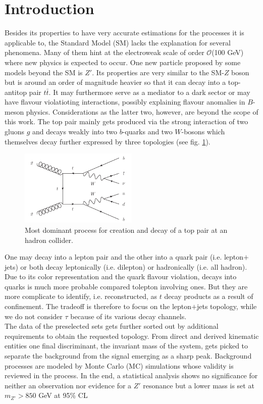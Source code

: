
\section{Introduction}
Besides its properties to have very accurate estimations for the processes it is applicable to, the Standard Model (SM) lacks the explanation for 
several phenomena. Many of them hint at the electroweak scale of order $\mathcal{O}$(100 GeV) where new physics is expected to occur. One new particle
proposed by some models beyond the SM is $Z'$. Its properties are very similar to the SM-$Z$ boson but is around an order of magnitude heavier so that
it can decay into a top-antitop pair $t\bar t$. It may furthermore serve as a mediator to a dark sector or may have flavour violatioting interactions, 
possibly 
explaining flavour anomalies in $B$-meson physics. Considerations as the latter two, however, are beyond the scope of this work. The top pair mainly
gets produced via the strong interaction of two gluons $g$ and decays weakly into two $b$-quarks and two $W$-bosons which themselves decay further 
expressed by three topologies (see fig. \ref{pic:feynman}). 
\begin{figure}
 \includegraphics[width=0.5\textwidth]{../pics/e4.pdf}
 \caption{Most dominant process for creation and decay of a top pair at an hadron collider.}
 \label{pic:feynman}
\end{figure}
One may decay into a lepton pair and the other into a quark pair (i.e. lepton$+$jets) or both decay leptonically 
(i.e. dilepton) or hadronically (i.e. all hadron). Due to its color representation and the quark flavour violation, decays into quarks is much more 
probable compared tolepton involving ones. But they are more complicate to identify, i.e. reconstructed, as $t$ decay products as a result of 
confinement. The tradeoff is therefore to focus on the lepton$+$jets topology, while we do not consider $\tau$ because of its various decay channels.
\\
\noindent The data \cite{Atlas} of the preselected sets gets further sorted out by additional requirements to obtain the requested topology. From direct and 
derived kinematic entities one final discriminant, the invariant mass of the system, gets picked to separate the background from the signal emerging
as a sharp peak. Background processes are modeled by Monte Carlo (MC) simulations whose validity is reviewed in the process. In the end, a statistical
analysis shows no significance for neither an observation nor evidence for a $Z'$ resonance but a lower mass is set at $m_{Z'} >850$ GeV at 
95\% CL


